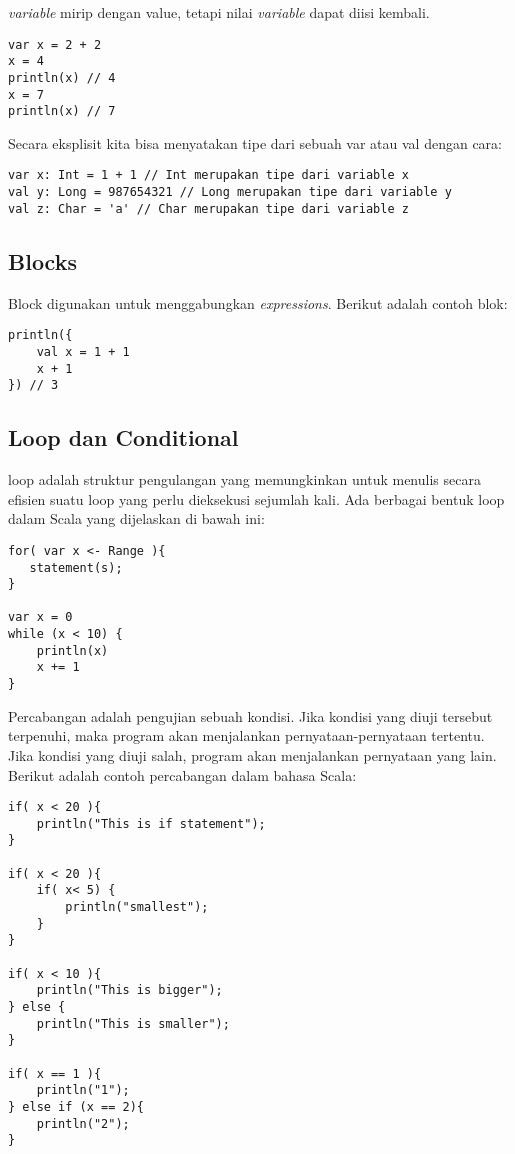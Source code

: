 \textit{variable} mirip dengan value, tetapi nilai \textit{variable} dapat diisi kembali.

\begin{verbatim}
var x = 2 + 2 
x = 4 
println(x) // 4 
x = 7 
println(x) // 7 
\end{verbatim}

Secara eksplisit kita bisa menyatakan tipe dari sebuah var atau val dengan cara:

\begin{verbatim}
var x: Int = 1 + 1 // Int merupakan tipe dari variable x
val y: Long = 987654321 // Long merupakan tipe dari variable y
val z: Char = 'a' // Char merupakan tipe dari variable z
\end{verbatim}

\subsection{Blocks}

Block digunakan untuk menggabungkan \textit{expressions}. Berikut adalah contoh blok:

\begin{verbatim}
println({
    val x = 1 + 1
    x + 1
}) // 3 
\end{verbatim}

\subsection{Loop dan Conditional}

loop adalah struktur pengulangan yang memungkinkan untuk menulis secara efisien suatu loop yang perlu dieksekusi sejumlah kali. Ada berbagai bentuk loop dalam Scala yang dijelaskan di bawah ini: 

\begin{verbatim}
for( var x <- Range ){
   statement(s);
}

var x = 0
while (x < 10) {
    println(x)
    x += 1
}
\end{verbatim}

Percabangan adalah pengujian sebuah kondisi. Jika kondisi yang diuji tersebut terpenuhi, maka program akan menjalankan pernyataan-pernyataan tertentu. Jika kondisi yang diuji salah, program akan menjalankan pernyataan yang lain. Berikut adalah contoh percabangan dalam bahasa Scala:

\begin{verbatim}
if( x < 20 ){
    println("This is if statement");
}

if( x < 20 ){
    if( x< 5) {
        println("smallest");
    }
}

if( x < 10 ){
    println("This is bigger");
} else { 
    println("This is smaller");
}

if( x == 1 ){
    println("1");
} else if (x == 2){ 
    println("2");
}
\end{verbatim}


